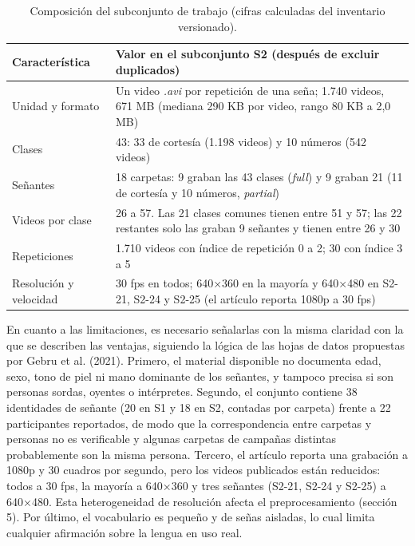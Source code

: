 \documentclass[11pt,a4paper]{article}
\newcommand{\code}[1]{\textit{#1}}
\begin{document}
\begin{table}[htbp]
\centering
\caption{Composición del subconjunto de trabajo (cifras calculadas del inventario versionado).}
\small
\renewcommand{\arraystretch}{1.22}
\begin{tabularx}{\textwidth}{@{}lY@{}}
\toprule
\textbf{Característica} & \textbf{Valor en el subconjunto S2 (después de excluir duplicados)}\\
\midrule
Unidad y formato & Un video \code{.avi} por repetición de una seña; 1.740 videos, 671 MB (mediana 290 KB por video, rango 80 KB a 2,0 MB)\\\addlinespace[3pt]
Clases & 43: 33 de cortesía (1.198 videos) y 10 números (542 videos)\\\addlinespace[3pt]
Señantes & 18 carpetas: 9 graban las 43 clases (\emph{full}) y 9 graban 21 (11 de cortesía y 10 números, \emph{partial})\\\addlinespace[3pt]
Videos por clase & 26 a 57. Las 21 clases comunes tienen entre 51 y 57; las 22 restantes solo las graban 9 señantes y tienen entre 26 y 30\\\addlinespace[3pt]
Repeticiones & 1.710 videos con índice de repetición 0 a 2; 30 con índice 3 a 5\\\addlinespace[3pt]
Resolución y velocidad & 30 fps en todos; 640×360 en la mayoría y 640×480 en S2-21, S2-24 y S2-25 (el artículo reporta 1080p a 30 fps)\\
\bottomrule
\end{tabularx}
\end{table}

En cuanto a las limitaciones, es necesario señalarlas con la misma claridad con la que se describen las ventajas, siguiendo la lógica de las hojas de datos propuestas por Gebru et al. (2021). Primero, el material disponible no documenta edad, sexo, tono de piel ni mano dominante de los señantes, y tampoco precisa si son personas sordas, oyentes o intérpretes. Segundo, el conjunto contiene 38 identidades de señante (20 en S1 y 18 en S2, contadas por carpeta) frente a 22 participantes reportados, de modo que la correspondencia entre carpetas y personas no es verificable y algunas carpetas de campañas distintas probablemente son la misma persona. Tercero, el artículo reporta una grabación a 1080p y 30 cuadros por segundo, pero los videos publicados están reducidos: todos a 30 fps, la mayoría a 640×360 y tres señantes (S2-21, S2-24 y S2-25) a 640×480. Esta heterogeneidad de resolución afecta el preprocesamiento (sección 5). Por último, el vocabulario es pequeño y de señas aisladas, lo cual limita cualquier afirmación sobre la lengua en uso real.
\end{document}
